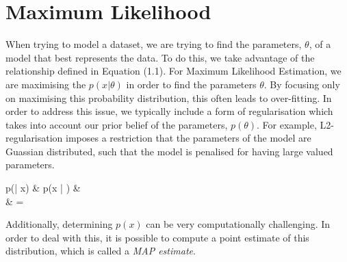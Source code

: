 \documentclass{article}
\begin{document}
\section{Maximum Likelihood}

When trying to model a dataset, we are trying to find the parameters, $\theta$, of a model that best represents the data. To do this, we take advantage of the relationship defined in Equation (1.1). For Maximum Likelihood Estimation, we are maximising the $p(x| \theta)$ in order to find the parameters $\theta$. By focusing only on maximising this probability distribution, this often leads to over-fitting. In order to address this issue, we typically include a form of regularisation which takes into account our prior belief of the parameters, $p(\theta)$. For example, L2-regularisation imposes a restriction that the parameters of the model are Guassian distributed, such that the model is penalised for having large valued parameters. 

\begin{center}
	\begin{flalign}
	p(\theta | x) & \propto p(x | \theta) & \\
	& =  
	\end{flalign}
\end{center}

Additionally, determining $p(x)$ can be very computationally challenging. In order to deal with this, it is possible to compute a point estimate of this distribution, which is called a \textit{MAP estimate}.

\end{document}
